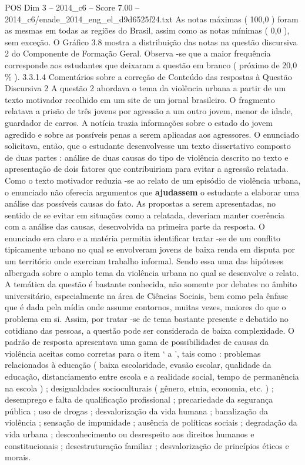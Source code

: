\begin{textsample}{POS Dim 3 – 2014\_c6 – Score 7.00 – 2014\_c6/enade\_2014\_eng\_el\_d9d6525f24.txt}
As notas máximas ( 100,0 ) foram as mesmas em todas as regiões do Brasil, assim como as notas mínimas ( 0,0 ), sem exceção.
O Gráfico 3.8 mostra a distribuição das notas na questão discursiva 2 do Componente de Formação Geral.
Observa -se que a maior frequência corresponde aos estudantes que deixaram a questão em branco ( próximo de 20,0 \% ). 3.3.1.4 Comentários sobre a correção de Conteúdo das respostas à Questão Discursiva 2 A questão 2 abordava o tema da violência urbana a partir de um texto motivador recolhido em um site de um jornal brasileiro.
O fragmento relatava a prisão de três jovens por agressão a um outro jovem, menor de idade, guardador de carros.
A notícia trazia informações sobre o estado do jovem agredido e sobre as possíveis penas a serem aplicadas aos agressores.
O enunciado solicitava, então, que o estudante desenvolvesse um texto dissertativo composto de duas partes : análise de duas causas do tipo de violência descrito no texto e apresentação de dois fatores que contribuiriam para evitar a agressão relatada.
Como o texto motivador reduzia -se ao relato de um episódio de violência urbana, o enunciado não oferecia argumentos que \textbf{ajudassem} o estudante a elaborar uma análise das possíveis causas do fato.
As propostas a serem apresentadas, no sentido de se evitar em situações como a relatada, deveriam manter coerência com a análise das causas, desenvolvida na primeira parte da resposta.
O enunciado era claro e a matéria permitia identificar tratar -se de um conflito tipicamente urbano no qual se envolveram jovens de baixa renda em disputa por um território onde exerciam trabalho informal.
Sendo essa uma das hipóteses albergada sobre o amplo tema da violência urbana no qual se desenvolve o relato.
A temática da questão é bastante conhecida, não somente por debates no âmbito universitário, especialmente na área de Ciências Sociais, bem como pela ênfase que é dada pela mídia onde assume contornos, muitas vezes, maiores do que o problema em si.
Assim, por tratar -se de tema bastante presente e debatido no cotidiano das pessoas, a questão pode ser considerada de baixa complexidade.
O padrão de resposta apresentava uma gama de possibilidades de causas da violência aceitas como corretas para o item ‘ a ’, tais como : problemas relacionados à educação ( baixa escolaridade, evasão escolar, qualidade da educação, distanciamento entre escola e a realidade social, tempo de permanência na escola ) ; desigualdades socioculturais ( gênero, etnia, economia, etc. ) ; desemprego e falta de qualificação profissional ; precariedade da segurança pública ; uso de drogas ; desvalorização da vida humana ; banalização da violência ; sensação de impunidade ; ausência de políticas sociais ; degradação da vida urbana ; desconhecimento ou desrespeito aos direitos humanos e constitucionais ; desestruturação familiar ; desvalorização de princípios éticos e morais.

\end{textsample}
